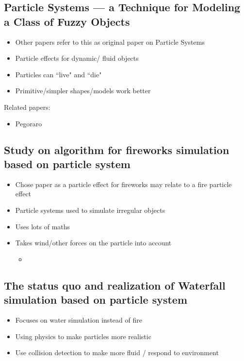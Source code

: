 \documentclass{scrartcl}
\begin{document}
\subsection{ Particle Systems --- a Technique for Modeling a Class of Fuzzy Objects \cite{Reeves}}
\begin{itemize}
	\item Other papers refer to this as original paper on Particle Systems
	\item Particle effects for dynamic/ fluid objects 
	\item Particles can ``live" and ``die"
	\item Primitive/simpler shapes/models work better
\end{itemize}
Related papers: \begin{itemize}
	\item Pegoraro \cite{Pegoraro}
\end{itemize}

\subsection{Study on algorithm for fireworks simulation based on particle system \cite{Lei}}
\begin{itemize}
	\item Chose paper as a particle effect for fireworks may relate to a fire particle effect
	\item Particle systems used to simulate irregular objects 
	\item Uses lots of maths
	\item Takes wind/other forces on the particle into account
	\begin{itemize}
		\item 
	\end{itemize}
\end{itemize}

\subsection{ The status quo and realization of Waterfall simulation based on particle system \cite{Shi}}
\begin{itemize}
	\item Focuses on water simulation instead of fire
	\item Using physics to make particles more realistic 
	\item Use collision detection to make more fluid / respond to environment 	
\end{itemize}
\end{document}
